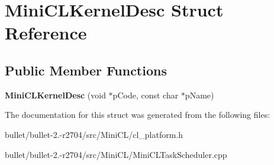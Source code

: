 \hypertarget{struct_mini_c_l_kernel_desc}{\section{Mini\+C\+L\+Kernel\+Desc Struct Reference}
\label{struct_mini_c_l_kernel_desc}
}
\subsection*{Public Member Functions}
\begin{DoxyCompactItemize}
\item 
\hypertarget{struct_mini_c_l_kernel_desc_a8772aab7773773dc3ddd63d7b39590b4}{{\bfseries Mini\+C\+L\+Kernel\+Desc} (void $\ast$p\+Code, const char $\ast$p\+Name)}\label{struct_mini_c_l_kernel_desc_a8772aab7773773dc3ddd63d7b39590b4}

\end{DoxyCompactItemize}


The documentation for this struct was generated from the following files\+:\begin{DoxyCompactItemize}
\item 
bullet/bullet-\/2.-\/r2704/src/\+Mini\+C\+L/cl\+\_\+platform.\+h\item 
bullet/bullet-\/2.-\/r2704/src/\+Mini\+C\+L/Mini\+C\+L\+Task\+Scheduler.\+cpp\end{DoxyCompactItemize}
